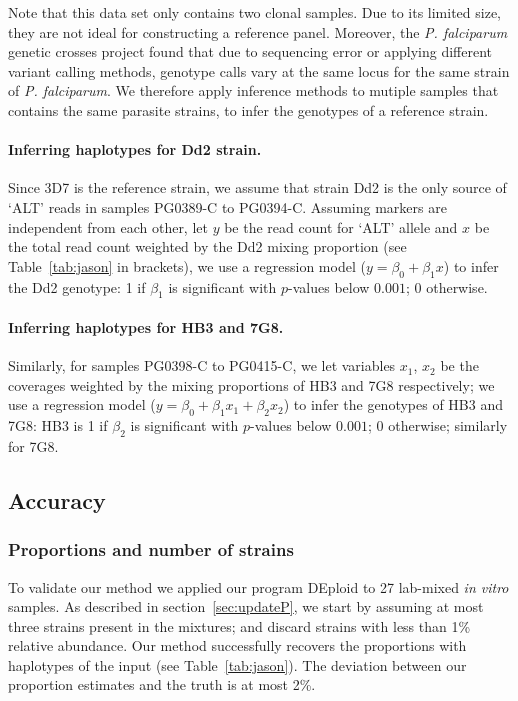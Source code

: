 \documentclass{bioinfo}
\begin{document}
Note that this data set only contains two clonal samples. Due to its limited size, they are not ideal for constructing a reference panel. Moreover, the {\em P. falciparum} genetic crosses project \citep{Miles2016} found that due to sequencing error or applying different variant calling methods, genotype calls vary at the same locus for the same strain of {\em P. falciparum}. We therefore apply inference methods to mutiple samples that contains the same parasite strains, to infer the genotypes of a reference strain.

\paragraph{Inferring haplotypes for Dd2 strain.}
Since 3D7 is the reference strain, we assume that strain Dd2 is the only source of `ALT' reads in samples {\textmd PG0389-C} to {\textmd PG0394-C}. Assuming markers are independent from each other, let $y$ be the read count for `ALT' allele and $x$ be the total read count weighted by the Dd2 mixing proportion (see Table~\ref{tab:jason} in brackets), we use a regression model ($y = \beta_0 + \beta_{1} x$) to infer the Dd2 genotype: 1 if $\beta_{1}$ is significant with $p$-values below $0.001$; 0 otherwise.

\paragraph{Inferring haplotypes for HB3 and 7G8.}
Similarly, for samples {\textmd PG0398-C} to {\textmd PG0415-C}, we let variables $x_1$, $x_2$ be the coverages weighted by the mixing proportions of HB3 and 7G8 respectively; we use a regression model ($y = \beta_0 + \beta_{1} x_1 + \beta_{2} x_2$) to infer the genotypes of HB3 and 7G8: HB3 is 1 if $\beta_{2}$ is significant with $p$-values below $0.001$; 0 otherwise; similarly for 7G8.

\subsection{Accuracy}
\subsubsection{Proportions and number of strains}
To validate our method we applied our program {\textmd DEploid} to 27 lab-mixed {\em in vitro} samples. As described in section~\ref{sec:updateP}, we start by assuming at most three strains present in the mixtures; and discard strains with less than 1\% relative abundance. Our method successfully recovers the proportions with haplotypes of the input (see Table~\ref{tab:jason}). The deviation between our proportion estimates and the truth is at most 2\%.
\end{document}

